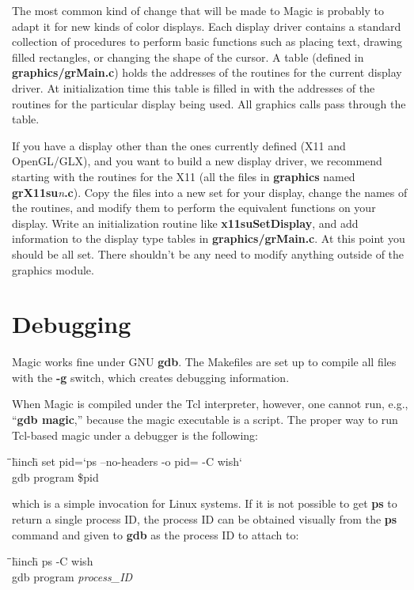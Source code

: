 \documentclass[letterpaper,twoside,12pt]{article}
\def\hinch{\hspace*{0.5in}}
\def\starti{\begin{center}\begin{tabbing}\hinch\=\hinch\=
	\hinch\=hinch\hinch\=\kill}
\def\endi{\end{tabbing}\end{center}}
\def\ii{\>\>\>}
\begin{document}
The most common kind of change that will be
made to Magic is probably to adapt it for new kinds of color displays.
Each display driver contains a standard collection of
procedures to perform basic functions such as placing text,
drawing filled rectangles, or changing the shape of the cursor.
A table (defined in {\bfseries graphics/grMain.c}) holds the addresses
of the routines for the current display driver.  At initialization
time this table is filled in with the addresses of the routines
for the particular display being used.  All graphics calls pass
through the table.

If you have a display other than the ones currently defined
(X11 and OpenGL/GLX), and you want to build a
new display driver, we recommend starting with the routines for
the X11 (all the files in {\bfseries graphics} named
{\bfseries grX11su}{\itshape n}{\bfseries .c}).
Copy the files into a new set for your display,
change the names of the routines, and modify them to perform
the equivalent functions on your display.  Write an initialization
routine like {\bfseries x11suSetDisplay}, and add information to the
display type tables in {\bfseries graphics/grMain.c}.  At this point
you should be all set.  There shouldn't be any need to modify
anything outside of the graphics module.

\section{Debugging}

Magic works fine under GNU {\bfseries gdb}.  The Makefiles are set
up to compile all files with the {\bfseries -g} switch, which creates
debugging information.

When Magic is compiled under the Tcl interpreter, however,
one cannot run, e.g., ``{\bfseries gdb magic},'' because the
magic executable is a script.  The proper way to run Tcl-based
magic under a debugger is the following:

\starti
  \ii set pid=`ps --no-headers -o pid= -C wish` \\
  \ii gdb program \$pid
\endi

which is a simple invocation for Linux systems.  If it is not
possible to get {\bf ps} to return a single process ID, the
process ID can be obtained visually from the {\bf ps} command
and given to {\bf gdb} as the process ID to attach to:

\starti
  \ii ps -C wish \\
  \ii gdb program {\itshape process\_ID}
\endi
\end{document}
